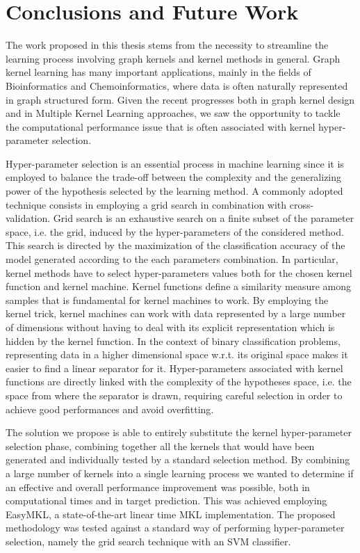\chapter{Conclusions and Future Work}
\label{Chapter5}

The work proposed in this thesis stems from the necessity to streamline the learning
process involving graph kernels and kernel methods in general.
Graph kernel learning has many important applications, mainly in the fields of
Bioinformatics and Chemoinformatics, where data is often naturally represented
in graph structured form.
Given the recent progresses both in graph kernel design and in Multiple Kernel Learning
approaches, we saw the opportunity to tackle the computational performance 
issue that is often associated with kernel hyper-parameter selection.

Hyper-parameter selection is an essential process in machine learning since it
is employed to balance the trade-off between the complexity and the generalizing power of
the hypothesis selected by the learning method.
A commonly adopted technique consists in employing a grid search in combination
with cross-validation.
Grid search is an exhaustive search on a finite subset of the parameter space, i.e. the grid,
induced by the hyper-parameters of the considered method.
This search is directed by the maximization of the classification accuracy of the
model generated according to the each parameters combination.
In particular, kernel methods have to select hyper-parameters values both for
the chosen kernel function and kernel machine.
Kernel functions define a similarity measure among samples that is fundamental for
kernel machines to work.
By employing the kernel trick, kernel machines can work with data represented by
a large number of dimensions without having to deal with its explicit representation
which is hidden by the kernel function.
In the context of binary classification problems, representing data in a higher
dimensional space w.r.t. its original space makes it easier to find a linear
separator for it.
Hyper-parameters associated with kernel functions are directly linked with the
complexity of the hypotheses space, i.e. the space from where the separator is drawn,
requiring careful selection in order to achieve good performances and avoid overfitting.

The solution we propose is able to entirely substitute the kernel hyper-parameter selection
phase, combining together all the kernels that would have been generated
and individually tested by a standard selection method.
By combining a large number of kernels into a single learning process we wanted to determine if an
effective and overall performance improvement was possible, both in computational times and 
in target prediction.
This was achieved employing EasyMKL, a state-of-the-art linear time MKL implementation.
The proposed methodology was tested against a standard way of performing hyper-parameter
selection, namely the grid search technique with an SVM classifier.


